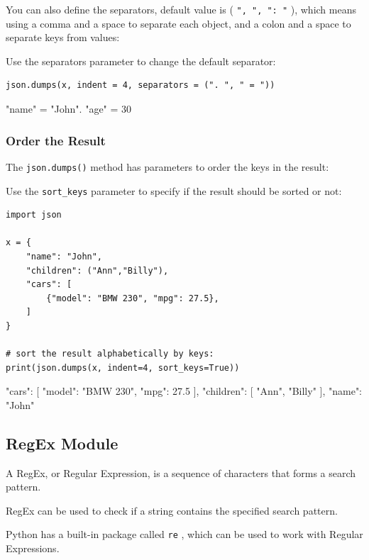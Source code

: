 \documentclass[12pt,a4paper]{article}
\newcommand{\code}[1]{%
	\colorbox{backcolour}{\lstinline{#1}}%
}
\newcommand{\lcode}[1]{%
	\lstinline{#1}%
}
\begin{document}
You can also define the separators, default value is (\code{", ", ": "}), which means
using a comma and a space to separate each object, and a colon and a space to
separate keys from values:

\begin{ebox}
Use the separators parameter to change the default separator:
	\begin{lstlisting}
json.dumps(x, indent = 4, separators = (". ", " = "))
	\end{lstlisting}
\tcblower
	\begin{vercode}
{
    "name" = "John".
    "age" = 30
}
	\end{vercode}
\end{ebox}
\subsubsection{Order the Result}

The \code{json.dumps()} method has parameters to order the keys in the result:

\begin{ebox}
Use the \lcode{sort_keys} parameter to specify if the result should be sorted or not:
	\begin{lstlisting}
import json

x = {
    "name": "John",
    "children": ("Ann","Billy"),
    "cars": [
        {"model": "BMW 230", "mpg": 27.5},
    ]
}

# sort the result alphabetically by keys:
print(json.dumps(x, indent=4, sort_keys=True))
	\end{lstlisting}
\tcblower
	\begin{vercode}
{
    "cars": [
        {
            "model": "BMW 230",
            "mpg": 27.5
        }
    ],
    "children": [
        "Ann",
        "Billy"
    ],
    "name": "John"
}
	\end{vercode}
\end{ebox}
\subsection{RegEx Module}

A RegEx, or Regular Expression, is a sequence of characters that forms a search
pattern.

RegEx can be used to check if a string contains the specified search pattern.

Python has a built-in package called \code{re}, which can be used to work with
Regular Expressions.
\end{document}
